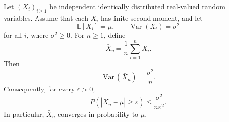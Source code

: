 \begin{theorem}
Let $(X_i)_{i\ge 1}$ be independent identically distributed real-valued
random variables. Assume that each $X_i$ has finite second moment, and let
\[
\mathbb{E}[X_i]=\mu,
\qquad
\operatorname{Var}(X_i)=\sigma^2
\]
for all $i$, where $\sigma^2\ge 0$. For $n\ge 1$, define
\[
\bar X_n=\frac{1}{n}\sum_{i=1}^n X_i.
\]
Then
\[
\operatorname{Var}(\bar X_n)=\frac{\sigma^2}{n}.
\]
Consequently, for every $\varepsilon>0$,
\[
P\left(|\bar X_n-\mu|\ge \varepsilon\right)
\le
\frac{\sigma^2}{n\varepsilon^2}.
\]
In particular, $\bar X_n$ converges in probability to $\mu$.
\end{theorem}
